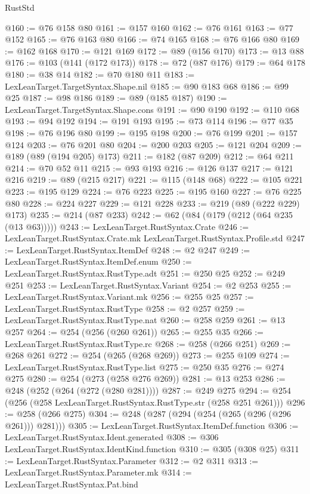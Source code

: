 \begin{lexlean}{RustStd}
\begin{coremodule}
{\begin{coremodule}
{{{{{{{{@160 := @76 @158 @80
@161 := @157 @160
@162 := @76 @161
@163 := @77 @152
@165 := @76 @163 @80
@166 := @74 @165
@168 := @76 @166 @80
@169 := @162 @168
@170 := @121 @169
@172 := @89 (@156 @170)
@173 := @13 @88
@176 := @103 (@141 (@172 @173))
@178 := @72 (@87 @176)
@179 := @64 @178
@180 := @38 @14
@182 := @70 @180 @11
@183 := LexLeanTarget.TargetSyntax.Shape.nil
@185 := @90 @183 @68
@186 := @99 @25
@187 := @98 @186
@189 := @89 (@185 @187)
@190 := LexLeanTarget.TargetSyntax.Shape.cons
@191 := @90 @190
@192 := @110 @68
@193 := @94 @192
@194 := @191 @193
@195 := @73 @114
@196 := @77 @35
@198 := @76 @196 @80
@199 := @195 @198
@200 := @76 @199
@201 := @157 @124
@203 := @76 @201 @80
@204 := @200 @203
@205 := @121 @204
@209 := @189 (@89 (@194 @205) @173)
@211 := @182 (@87 @209)
@212 := @64 @211
@214 := @70 @52 @11
@215 := @93 @193
@216 := @126 @137
@217 := @121 @216
@219 := @89 (@215 @217)
@221 := @115 (@148 @68)
@222 := @105 @221
@223 := @195 @129
@224 := @76 @223
@225 := @195 @160
@227 := @76 @225 @80
@228 := @224 @227
@229 := @121 @228
@233 := @219 (@89 (@222 @229) @173)
@235 := @214 (@87 @233)
@242 := @62 (@84 (@179 (@212 (@64 @235 (@13 @63)))))
@243 := LexLeanTarget.RustSyntax.Crate
@246 := LexLeanTarget.RustSyntax.Crate.mk LexLeanTarget.RustSyntax.Profile.std
@247 := LexLeanTarget.RustSyntax.ItemDef
@248 := @2 @247
@249 := LexLeanTarget.RustSyntax.ItemDef.enum
@250 := LexLeanTarget.RustSyntax.RustType.adt
@251 := @250 @25
@252 := @249 @251
@253 := LexLeanTarget.RustSyntax.Variant
@254 := @2 @253
@255 := LexLeanTarget.RustSyntax.Variant.mk
@256 := @255 @25
@257 := LexLeanTarget.RustSyntax.RustType
@258 := @2 @257
@259 := LexLeanTarget.RustSyntax.RustType.nat
@260 := @258 @259
@261 := @13 @257
@264 := @254 (@256 (@260 @261))
@265 := @255 @35
@266 := LexLeanTarget.RustSyntax.RustType.rc
@268 := @258 (@266 @251)
@269 := @268 @261
@272 := @254 (@265 (@268 @269))
@273 := @255 @109
@274 := LexLeanTarget.RustSyntax.RustType.list
@275 := @250 @35
@276 := @274 @275
@280 := @254 (@273 (@258 @276 @269))
@281 := @13 @253
@286 := @248 (@252 (@264 (@272 (@280 @281))))
@287 := @249 @275
@294 := @254 (@256 (@258 LexLeanTarget.RustSyntax.RustType.str (@258 @251 @261)))
@296 := @258 (@266 @275)
@304 := @248 (@287 (@294 (@254 (@265 (@296 (@296 @261))) @281)))
@305 := LexLeanTarget.RustSyntax.ItemDef.function
@306 := LexLeanTarget.RustSyntax.Ident.generated
@308 := @306 LexLeanTarget.RustSyntax.IdentKind.function
@310 := @305 (@308 @25)
@311 := LexLeanTarget.RustSyntax.Parameter
@312 := @2 @311
@313 := LexLeanTarget.RustSyntax.Parameter.mk
@314 := LexLeanTarget.RustSyntax.Pat.bind
}}}}}}}}
\end{coremodule}}
\end{coremodule}
\end{lexlean}
